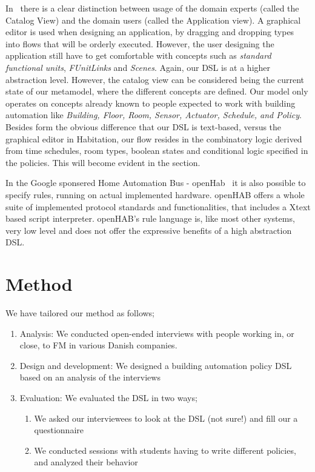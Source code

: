 \documentclass{llncs}
\begin{document}
In~\cite{habitation} there is a clear distinction between usage of the domain experts (called the Catalog View) and the domain users (called the Application view). A graphical editor is used when designing an application, by dragging and dropping types into flows that will be orderly executed. However, the user designing the application still have to get comfortable with concepts such as \textit{standard functional units}, \textit{FUnitLinks} and \textit{Scenes}. Again, our DSL is at a higher abstraction level. However, the catalog view can be considered being the current state of our metamodel, where the different concepts are defined. Our model only operates on concepts already known to people expected to work with building automation like \textit{Building, Floor, Room, Sensor, Actuator, Schedule, and Policy}. Besides form the obvious difference that our DSL is text-based, versus the graphical editor in Habitation, our flow resides in the combinatory logic derived from time schedules, room types, boolean states and conditional logic specified in the policies. This will become evident in the  section.

In the Google sponsered Home Automation Bus - openHab~\cite{openhab} it is also possible to specify rules, running on actual implemented hardware. openHAB offers a whole suite of implemented protocol standards and functionalities, that includes a Xtext based script interpreter. openHAB's rule language is, like most other systems, very low level and does not offer the expressive benefits of a high abstraction DSL.

\section{Method}\label{sec:method}
We have tailored our method as follows;

\begin{enumerate}
	\item Analysis: We conducted open-ended interviews with people working in, or close, to FM in various Danish companies.
	\item Design and development: We designed a building automation policy DSL based on an analysis of the interviews
	\item Evaluation: We evaluated the DSL in two ways;
	\begin{enumerate}
		\item We asked our interviewees to look at the DSL (not sure!) and fill our a questionnaire
		\item We conducted sessions with students having to write different policies, and analyzed their behavior
	\end{enumerate}
\end{enumerate}
\end{document}
